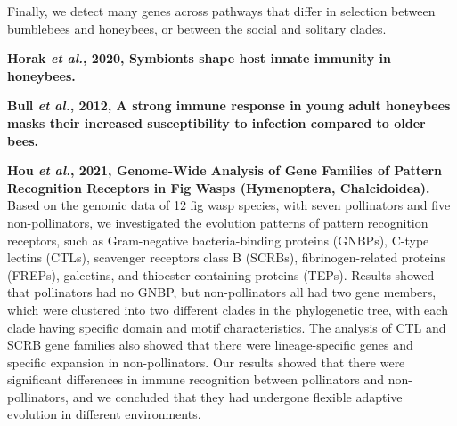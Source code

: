 \documentclass[11pt]{article}
\begin{document}
\begin{sloppypar}
Finally, we detect many genes across pathways that differ in selection between bumblebees and honeybees, or between the social and solitary clades.
\par
\textbf{Horak \textit{et al.}, 2020, Symbionts shape host innate immunity in honeybees.} \newline
\par
\textbf{Bull \textit{et al.}, 2012, A strong immune response in young adult honeybees masks their increased susceptibility to infection compared to older bees.}
\par
\textbf{Hou \textit{et al.}, 2021, Genome-Wide Analysis of Gene Families of Pattern Recognition Receptors in Fig Wasps (Hymenoptera, Chalcidoidea).} \newline
Based on the genomic data of 12 fig wasp species, with seven pollinators and five non-pollinators, we investigated the evolution patterns of pattern recognition receptors, such as Gram-negative bacteria-binding proteins (GNBPs), C-type lectins (CTLs), scavenger receptors class B (SCRBs), fibrinogen-related proteins (FREPs), galectins, and thioester-containing proteins (TEPs). 
Results showed that pollinators had no GNBP, but non-pollinators all had two gene members, which were clustered into two different clades in the phylogenetic tree, with each clade having specific domain and motif characteristics. 
The analysis of CTL and SCRB gene families also showed that there were lineage-specific genes and specific expansion in non-pollinators. 
Our results showed that there were significant differences in immune recognition between pollinators and non-pollinators, and we concluded that they had undergone flexible adaptive evolution in different environments.

\end{sloppypar}
\end{document}
